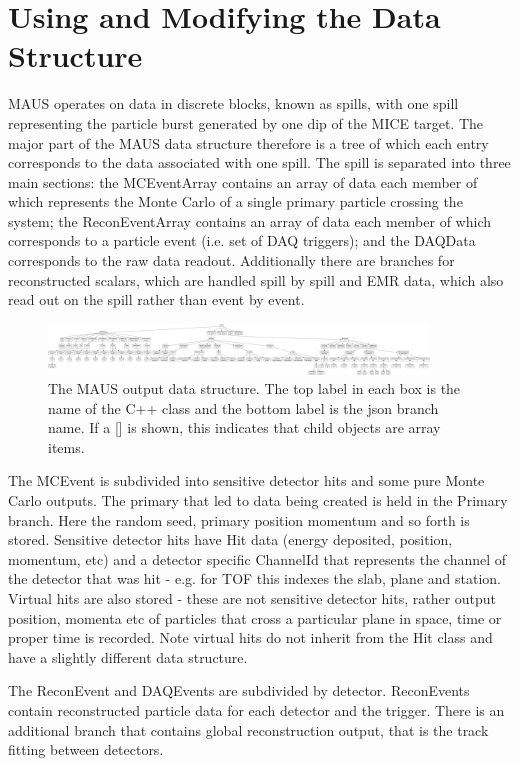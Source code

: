 \chapter{Using and Modifying the Data Structure}
\label{chapter:data_structure}
MAUS operates on data in discrete blocks, known as spills, with one spill representing the particle burst generated by one dip of the MICE target. The major part of the MAUS data structure therefore is a tree of which each entry corresponds to the data associated with one spill. The spill is separated into three main sections: the MCEventArray contains an array of data each member of which represents the Monte Carlo of a single primary particle crossing the system; the ReconEventArray contains an array of data each member of which corresponds to a particle event (i.e. set of DAQ triggers); and the DAQData corresponds to the raw data readout. Additionally there are branches for reconstructed scalars, which are handled spill by spill and EMR data, which also read out on the spill rather than event by event.

\begin{figure}[!p]
\centering
\includegraphics[width=0.9\textwidth]{data_structure.png}
\caption{The MAUS output data structure. The top label in each box is the name of the C++ class and the bottom label is the json branch name. If a [] is shown, this indicates that child objects are array items.}
\end{figure}

The MCEvent is subdivided into sensitive detector hits and some pure Monte Carlo outputs. The primary that led to data being created is held in the Primary branch. Here the random seed, primary position momentum and so forth is stored. Sensitive detector hits have Hit data (energy deposited, position, momentum, etc) and a detector specific ChannelId that represents the channel of the detector that was hit - e.g. for TOF this indexes the slab, plane and station. Virtual hits are also stored - these are not sensitive detector hits, rather output position, momenta etc of particles that cross a particular plane in space, time or proper time is recorded. Note virtual hits do not inherit from the Hit class and have a slightly different data structure.

The ReconEvent and DAQEvents are subdivided by detector. ReconEvents contain reconstructed particle data for each detector and the trigger. There is an additional branch that contains global reconstruction output, that is the track fitting between detectors.

